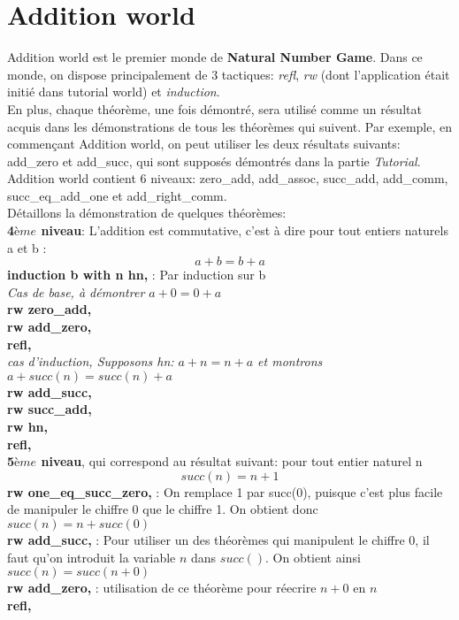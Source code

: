 \section{Addition world}
Addition world est le premier monde de \textbf{Natural Number Game}. Dans ce monde, on dispose principalement de 3 tactiques: \textit{refl}, \textit{rw} (dont l'application était initié dans tutorial world) et \textit{induction}.\\
En plus, chaque théorème, une fois démontré, sera utilisé comme un résultat acquis dans les démonstrations de tous les théorèmes qui suivent. Par exemple, en commençant Addition world, on peut utiliser les deux résultats suivants: add\_zero et add\_succ, qui sont supposés démontrés dans la partie \textit{Tutorial}.\\
Addition world contient 6 niveaux: zero\_add, add\_assoc, succ\_add, add\_comm, succ\_eq\_add\_one et add_right_comm.\\

Détaillons la démonstration de quelques théorèmes:\\

\textbf{4${ème}$ niveau}: L'addition est commutative, c'est à dire pour tout entiers naturels a et b : $$a+b=b+a$$ 
\textbf{induction b with n hn,} : Par induction sur b \\
\textit{Cas de base, à démontrer $a + 0 = 0 + a$}\\
\textbf{rw zero\_add,}\\
 \textbf{rw add\_zero,}\\
 \textbf{refl,}\\
\textit{cas d'induction, Supposons hn: $a + n = n + a$ et montrons $a + succ (n) = succ (n) + a
$}\\
 \textbf{rw add\_succ,}\\
 \textbf{rw succ\_add,}\\
 \textbf{rw hn,}\\
 \textbf{refl,}\\
 
\textbf{5${ème}$ niveau}, qui correspond au résultat suivant: pour tout entier naturel n  $$succ(n)=n+1$$
\textbf{rw one\_eq\_succ\_zero,} : On remplace 1 par succ(0), puisque c'est plus facile de manipuler le chiffre 0 que le chiffre 1. On obtient donc $succ(n)=n+succ(0)$\\
 \textbf{rw add\_succ,} : Pour utiliser un des théorèmes qui manipulent le chiffre 0, il faut qu'on introduit la variable $n$ dans $succ()$. On obtient ainsi $succ(n)=succ(n+0)$ \\
\textbf{rw add\_zero,} : utilisation de ce théorème pour réecrire $n+0$ en $n$ \\
\textbf{refl,}

